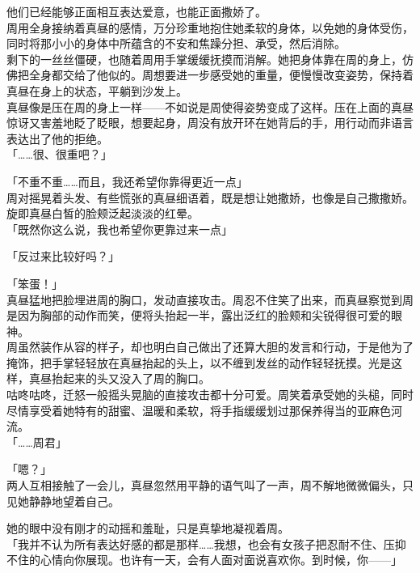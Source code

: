 他们已经能够正面相互表达爱意，也能正面撒娇了。\\

周用全身接纳着真昼的感情，万分珍重地抱住她柔软的身体，以免她的身体受伤，同时将那小小的身体中所蕴含的不安和焦躁分担、承受，然后消除。\\

剩下的一丝丝僵硬，也随着周用手掌缓缓抚摸而消解。她把身体靠在周的身上，仿佛把全身都交给了他似的。周想要进一步感受她的重量，便慢慢改变姿势，保持着真昼在身上的状态，平躺到沙发上。\\

真昼像是压在周的身上一样——不如说是周使得姿势变成了这样。压在上面的真昼惊讶又害羞地眨了眨眼，想要起身，周没有放开环在她背后的手，用行动而非语言表达出了他的拒绝。\\

「……很、很重吧？」

「不重不重……而且，我还希望你靠得更近一点」\\

周对摇晃着头发、有些慌张的真昼细语着，既是想让她撒娇，也像是自己撒撒娇。旋即真昼白皙的脸颊泛起淡淡的红晕。\\

「既然你这么说，我也希望你更靠过来一点」

「反过来比较好吗？」

「笨蛋！」\\

真昼猛地把脸埋进周的胸口，发动直接攻击。周忍不住笑了出来，而真昼察觉到周是因为胸部的动作而笑，便将头抬起一半，露出泛红的脸颊和尖锐得很可爱的眼神。\\

周虽然装作从容的样子，却也明白自己做出了还算大胆的发言和行动，于是他为了掩饰，把手掌轻轻放在真昼抬起的头上，以不缠到发丝的动作轻轻抚摸。光是这样，真昼抬起来的头又没入了周的胸口。\\

咕咚咕咚，迁怒一般摇头晃脑的直接攻击都十分可爱。周笑着承受她的头槌，同时尽情享受着她特有的甜蜜、温暖和柔软，将手指缓缓划过那保养得当的亚麻色河流。\\

「……周君」

「嗯？」\\

两人互相接触了一会儿，真昼忽然用平静的语气叫了一声，周不解地微微偏头，只见她静静地望着自己。

她的眼中没有刚才的动摇和羞耻，只是真挚地凝视着周。\\

「我并不认为所有表达好感的都是那样……我想，也会有女孩子把忍耐不住、压抑不住的心情向你展现。也许有一天，会有人面对面说喜欢你。到时候，你——」

